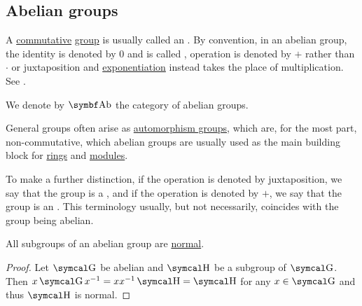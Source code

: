 \subsection{Abelian groups}\label{subsec:abelian_groups}

\begin{definition}\label{def:abelian_group}
  A \hyperref[def:magma/commutative]{commutative} \hyperref[def:group]{group} is usually called an . By convention, in an abelian group, the identity is denoted by \( 0 \) and is called , operation is denoted by \( + \) rather than \( \cdot \) or juxtaposition and \hyperref[def:unital_magma/exponentiation]{exponentiation} instead takes the place of multiplication. See .

  We denote by \( \Cat{Ab} \) the category of abelian groups.
\end{definition}

\begin{remark}\label{remark:additive_group}
  General groups often arise as \hyperref[def:automorphism_group]{automorphism groups}, which are, for the most part, non-commutative, which abelian groups are usually used as the main building block for \hyperref[def:ring]{rings} and \hyperref[def:left_module]{modules}.

  To make a further distinction, if the operation is denoted by juxtaposition, we say that the group is a , and if the operation is denoted by \( + \), we say that the group is an . This terminology usually, but not necessarily, coincides with the group being abelian.
\end{remark}

\begin{proposition}\label{thm:abelian_normal_subgroups}
  All subgroups of an abelian group are \hyperref[def:normal_subgroups]{normal}.
\end{proposition}
\begin{proof}
  Let \( \CG \) be abelian and \( \CH \) be a subgroup of \( \CG \). Then \( x \CG x^{-1} = xx^{-1} \CH = \CH \) for any \( x \in \CG \) and thus \( \CH \) is normal.
\end{proof}

